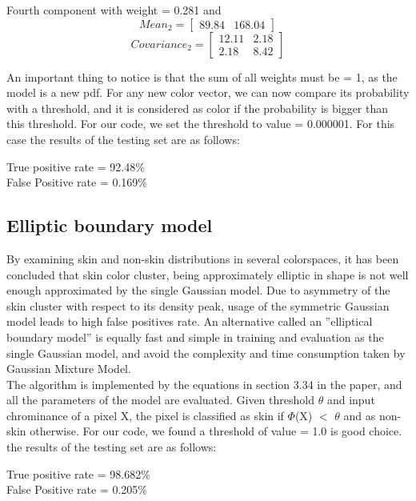 \documentclass[12pt]{article} %
\begin{document}
Fourth component with weight = 0.281 and 
$$
Mean_2 =  \begin{bmatrix}
  89.84 & 168.04
 \end{bmatrix}
$$
$$
Covariance_2 =  \begin{bmatrix}
  12.11 & 2.18 \\
  2.18 & 8.42
 \end{bmatrix}
$$

An important thing to notice is that the sum of all weights must be = 1, as the model is a new pdf. For any new color vector, we can now compare its probability with a threshold, and it is considered as color if the probability is bigger than this threshold. For our code, we set the threshold to value = 0.000001. For this case the results of the testing set are as follows:


\begin{center}
True positive rate = 92.48\% \\
False Positive rate = 0.169\%
\end{center}


\subsection{Elliptic boundary model}
By examining skin and non-skin distributions in several colorspaces, it has been concluded that skin color cluster, being approximately elliptic in shape is not well enough approximated by the single Gaussian model. Due to asymmetry of the skin cluster with respect to its density peak, usage of the symmetric Gaussian model leads to high false positives rate. An alternative called an ”elliptical boundary model” is equally fast and simple in training and evaluation as the single Gaussian model, and avoid the complexity and time consumption taken by Gaussian Mixture Model. \\

The algorithm is implemented by the equations in section 3.34 in the paper, and all the parameters of the model are evaluated. Given threshold $\theta$ and input chrominance of a pixel X, the pixel is classified as skin if  $\Phi$(X) $<$  $\theta$ and as non-skin otherwise. For our code, we found a threshold of value = 1.0 is good choice. the results of the testing set are as follows:

\begin{center}
True positive rate = 98.682\% \\
False Positive rate = 0.205\%
\end{center}
\end{document}
